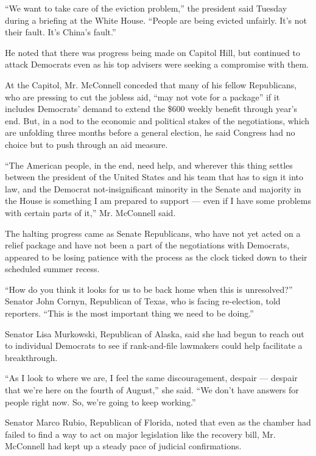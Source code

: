 ``We want to take care of the eviction problem,'' the president said
Tuesday during a briefing at the White House. ``People are being evicted
unfairly. It's not their fault. It's China's fault.''

He noted that there was progress being made on Capitol Hill, but
continued to attack Democrats even as his top advisers were seeking a
compromise with them.

At the Capitol, Mr. McConnell conceded that many of his fellow
Republicans, who are pressing to cut the jobless aid, ``may not vote for
a package'' if it includes Democrats' demand to extend the \$600 weekly
benefit through year's end. But, in a nod to the economic and political
stakes of the negotiations, which are unfolding three months before a
general election, he said Congress had no choice but to push through an
aid measure.

``The American people, in the end, need help, and wherever this thing
settles between the president of the United States and his team that has
to sign it into law, and the Democrat not-insignificant minority in the
Senate and majority in the House is something I am prepared to support
--- even if I have some problems with certain parts of it,'' Mr.
McConnell said.

The halting progress came as Senate Republicans, who have not yet acted
on a relief package and have not been a part of the negotiations with
Democrats, appeared to be losing patience with the process as the clock
ticked down to their scheduled summer recess.

``How do you think it looks for us to be back home when this is
unresolved?'' Senator John Cornyn, Republican of Texas, who is facing
re-election, told reporters. ``This is the most important thing we need
to be doing.''

Senator Lisa Murkowski, Republican of Alaska, said she had begun to
reach out to individual Democrats to see if rank-and-file lawmakers
could help facilitate a breakthrough.

``As I look to where we are, I feel the same discouragement, despair ---
despair that we're here on the fourth of August,'' she said. ``We don't
have answers for people right now. So, we're going to keep working.''

Senator Marco Rubio, Republican of Florida, noted that even as the
chamber had failed to find a way to act on major legislation like the
recovery bill, Mr. McConnell had kept up a steady pace of judicial
confirmations.


